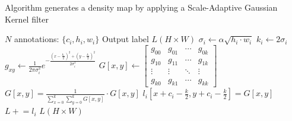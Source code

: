 \documentclass[journal]{IEEEtran}
\begin{document}
\begin{algorithm}[H]
        \caption{Algorithm generates a density map by applying a Scale-Adaptive Gaussian Kernel filter}
        \label{alg:density}
        \begin{algorithmic}[1]
                \renewcommand{\algorithmicrequire}{\textbf{Input:}}
                \renewcommand{\algorithmicensure}{\textbf{Output:}}
                \REQUIRE $N$ annotations: $\{c_i,h_i,w_i\}$
                \ENSURE  Output label $L(H \times W)$
                \STATE $\sigma_i \leftarrow \alpha\sqrt{h_i \cdot w_i}$
                \STATE $k_i \leftarrow 2\sigma_i$
                \STATE $g_{xy} \leftarrow \frac{1}{2\pi\sigma_i^2}e^{-\frac{(x-\frac{k_i}{2})^2+(y-\frac{k_i}{2})^2}{2\sigma_i^2}}$
                \ENDFOR
                \ENDFOR
                \STATE $G[x,y] \leftarrow
                        {\begin{bmatrix}
                                        g_{00} & g_{01} & \cdots & g_{0k} \\
                                        g_{10} & g_{11} & \cdots & g_{1k} \\
                                        \vdots & \vdots & \ddots & \vdots \\
                                        g_{k0} & g_{k1} & \cdots & g_{kk}
                                \end{bmatrix}}$
                \STATE $G[x,y] = \frac{1}{\sum_{x=0}^{k}\sum_{y=0}^{k}G[x,y]} \cdot G[x,y]$
                \STATE $l_i[x+c_i-\frac{k}{2},y+c_i-\frac{k}{2}] = G[x,y]$
                \ENDFOR
                \ENDFOR
                \STATE $L \mathrel{+}= l_i$
                \ENDFOR
                \RETURN $L(H \times W)$
        \end{algorithmic}
\end{algorithm}
\end{document}
